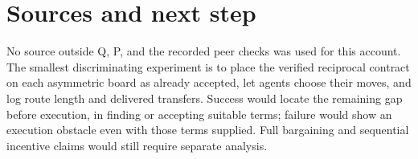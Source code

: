 \documentclass{article}
\begin{document}
\section*{Sources and next step}

No source outside Q, P, and the recorded peer checks was used for this account. The smallest discriminating experiment is to place the verified reciprocal contract on each asymmetric board as already accepted, let agents choose their moves, and log route length and delivered transfers. Success would locate the remaining gap before execution, in finding or accepting suitable terms; failure would show an execution obstacle even with those terms supplied. Full bargaining and sequential incentive claims would still require separate analysis. 
\end{document}
